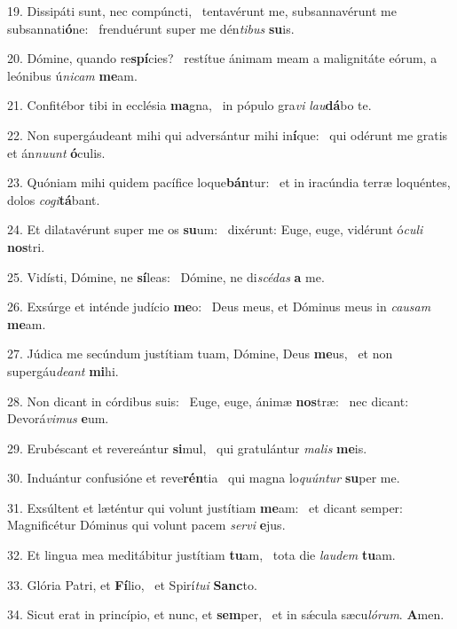 19. Dissipáti sunt, nec compúncti, \dag\  tentavérunt me, subsannavérunt me subsannati\textbf{ó}ne: \ast\  frenduérunt super me dén\textit{ti}\textit{bus} \textbf{su}is.\

20. Dómine, quando re\textbf{spí}cies? \ast\  restítue ánimam meam a malignitáte eórum, a leónibus ú\textit{ni}\textit{cam} \textbf{me}am.\

21. Confitébor tibi in ecclésia \textbf{ma}gna, \ast\  in pópulo gra\textit{vi} \textit{lau}\textbf{dá}bo te.\

22. Non supergáudeant mihi qui adversántur mihi in\textbf{í}que: \ast\  qui odérunt me gratis et án\textit{nu}\textit{unt} \textbf{ó}culis.\

23. Quóniam mihi quidem pacífice loque\textbf{bán}tur: \ast\  et in iracúndia terræ loquéntes, dolos \textit{co}\textit{gi}\textbf{tá}bant.\

24. Et dilatavérunt super me os \textbf{su}um: \ast\  dixérunt: Euge, euge, vidérunt ó\textit{cu}\textit{li} \textbf{nos}tri.\

25. Vidísti, Dómine, ne \textbf{sí}leas: \ast\  Dómine, ne di\textit{scé}\textit{das} \textbf{a} me.\

26. Exsúrge et inténde judício \textbf{me}o: \ast\  Deus meus, et Dóminus meus in \textit{cau}\textit{sam} \textbf{me}am.\

27. Júdica me secúndum justítiam tuam, Dómine, Deus \textbf{me}us, \ast\  et non supergáu\textit{de}\textit{ant} \textbf{mi}hi.\

28. Non dicant in córdibus suis: \dag\  Euge, euge, ánimæ \textbf{nos}træ: \ast\  nec dicant: Devorá\textit{vi}\textit{mus} \textbf{e}um.\

29. Erubéscant et revereántur \textbf{si}mul, \ast\  qui gratulántur \textit{ma}\textit{lis} \textbf{me}is.\

30. Induántur confusióne et reve\textbf{rén}tia \ast\  qui magna lo\textit{quún}\textit{tur} \textbf{su}per me.\

31. Exsúltent et læténtur qui volunt justítiam \textbf{me}am: \ast\  et dicant semper: Magnificétur Dóminus qui volunt pacem \textit{ser}\textit{vi} \textbf{e}jus.\

32. Et lingua mea meditábitur justítiam \textbf{tu}am, \ast\  tota die \textit{lau}\textit{dem} \textbf{tu}am.\

33. Glória Patri, et \textbf{Fí}lio, \ast\  et Spirí\textit{tu}\textit{i} \textbf{Sanc}to.\

34. Sicut erat in princípio, et nunc, et \textbf{sem}per, \ast\  et in sǽcula sæcu\textit{ló}\textit{rum}. \textbf{A}men.\

